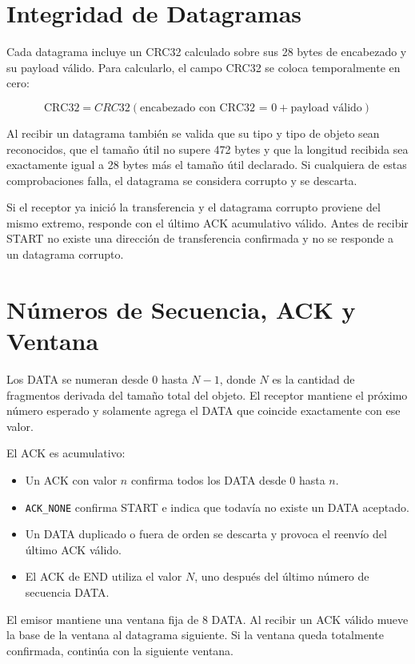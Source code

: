 \documentclass[12pt]{article}
\begin{document}
\section{Integridad de Datagramas}

Cada datagrama incluye un CRC32 calculado sobre sus 28 bytes de encabezado y
su payload válido. Para calcularlo, el campo CRC32 se coloca temporalmente en
cero:

\[
\text{CRC32} = CRC32(\text{encabezado con CRC32 = 0} + \text{payload válido})
\]

Al recibir un datagrama también se valida que su tipo y tipo de objeto sean
reconocidos, que el tamaño útil no supere 472 bytes y que la longitud recibida
sea exactamente igual a 28 bytes más el tamaño útil declarado. Si cualquiera
de estas comprobaciones falla, el datagrama se considera corrupto y se
descarta.

Si el receptor ya inició la transferencia y el datagrama corrupto proviene del
mismo extremo, responde con el último ACK acumulativo válido. Antes de recibir
START no existe una dirección de transferencia confirmada y no se responde a
un datagrama corrupto.

\section{Números de Secuencia, ACK y Ventana}

Los DATA se numeran desde 0 hasta $N-1$, donde $N$ es la cantidad de
fragmentos derivada del tamaño total del objeto. El receptor mantiene el
próximo número esperado y solamente agrega el DATA que coincide exactamente
con ese valor.

El ACK es acumulativo:

\begin{itemize}
\item Un ACK con valor $n$ confirma todos los DATA desde 0 hasta $n$.
\item \texttt{ACK\_NONE} confirma START e indica que todavía no existe un DATA aceptado.
\item Un DATA duplicado o fuera de orden se descarta y provoca el reenvío del último ACK válido.
\item El ACK de END utiliza el valor $N$, uno después del último número de secuencia DATA.
\end{itemize}

El emisor mantiene una ventana fija de 8 DATA. Al recibir un ACK válido mueve
la base de la ventana al datagrama siguiente. Si la ventana queda totalmente
confirmada, continúa con la siguiente ventana.
\end{document}
